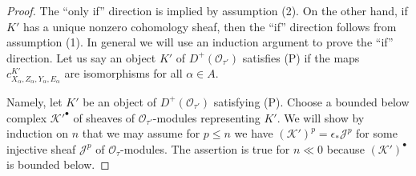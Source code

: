 \begin{proof}
The ``only if'' direction is implied by assumption (2).
On the other hand, if $K'$ has a unique nonzero cohomology sheaf,
then the ``if'' direction follows from assumption (1).
In general we will use an induction argument to prove the
``if'' direction. Let us say an object $K'$ of $D^+(\mathcal{O}_{\tau'})$
satisfies (P) if the maps $c^{K'}_{X_\alpha, Z_\alpha, Y_\alpha, E_\alpha}$
are isomorphisms for all $\alpha \in A$.

\medskip\noindent
Namely, let $K'$ be an object of $D^+(\mathcal{O}_{\tau'})$
satisfying (P). Choose a bounded below complex
${\mathcal{K}'}^\bullet$ of sheaves of $\mathcal{O}_{\tau'}$-modules
representing $K'$. We will show by induction on $n$ that we may assume
for $p \leq n$ we have $(\mathcal{K}')^p = \epsilon_*\mathcal{J}^p$ for some
injective sheaf $\mathcal{J}^p$ of $\mathcal{O}_{\tau}$-modules.
The assertion is true for $n \ll 0$ because $(\mathcal{K}')^\bullet$
is bounded below.


\end{proof}
